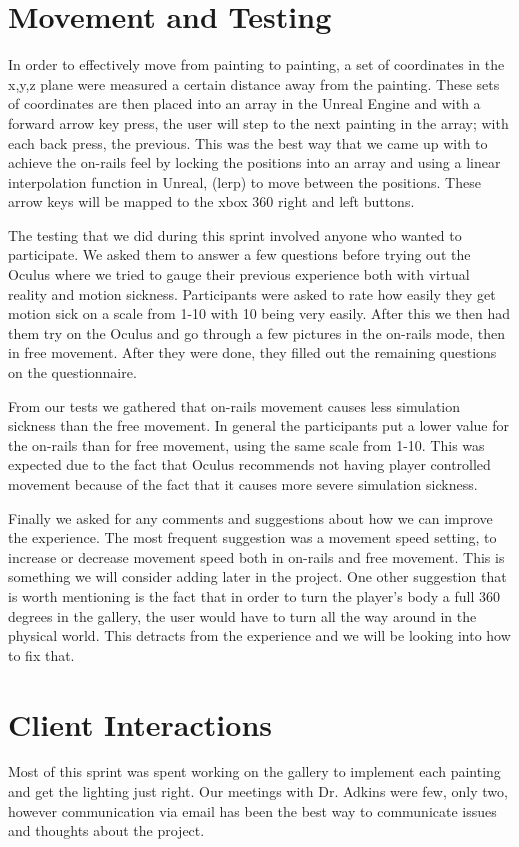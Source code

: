 \documentclass[11pt]{book}
\begin{document}
\section*{Movement and Testing}
In order to effectively move from painting to painting, a set of coordinates in the x,y,z plane were measured a certain distance away from the painting.  These sets of coordinates are then placed into an array in the Unreal Engine and with a forward arrow key press, the user will step to the next painting in the array; with each back press, the previous.  This was the best way that we came up with to achieve the on-rails feel by locking the positions into an array and using a linear interpolation function in Unreal, (lerp) to move between the positions.  These arrow keys will be mapped to the xbox 360 right and left buttons.

The testing that we did during this sprint involved anyone who wanted to participate.  We asked them to answer a few questions before trying out the Oculus where we tried to gauge their previous experience both with virtual reality and motion sickness.  Participants were asked to rate how easily they get motion sick on a scale from 1-10 with 10 being very easily. After this we then had them try on the Oculus and go through a few pictures in the on-rails mode, then in free movement.  After they were done, they filled out the remaining questions on the questionnaire. 

From our tests we gathered that on-rails movement causes less simulation sickness than the free movement.  In general the participants put a lower value for the on-rails than for free movement, using the same scale from 1-10.  This was expected due to the fact that Oculus recommends not having player controlled movement because of the fact that it causes more severe simulation sickness.

Finally we asked for any comments and suggestions about how we can improve the experience.  The most frequent suggestion was a movement speed setting, to increase or decrease movement speed both in on-rails and free movement.  This is something we will consider adding later in the project.  One other suggestion that is worth mentioning is the fact that in order to turn the player's body a full 360 degrees in the gallery, the user would have to turn all the way around in the physical world.  This detracts from the experience and we will be looking into how to fix that.

\section*{Client Interactions}
Most of this sprint was spent working on the gallery to implement each painting and get the lighting just right.  Our meetings with Dr. Adkins were few, only two, however communication via email has been the best way to communicate issues and thoughts about the project.  
\end{document}
